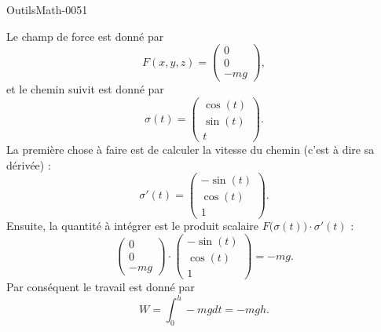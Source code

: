
\begin{corrige}{OutilsMath-0051}

    Le champ de force est donné par
    \begin{equation}
        F(x,y,z)=\begin{pmatrix}
            0    \\ 
            0    \\ 
            -mg    
        \end{pmatrix},
    \end{equation}
    et le chemin suivit est donné par 
    \begin{equation}
        \sigma(t)=\begin{pmatrix}
            \cos(t)    \\ 
            \sin(t)    \\ 
            t    
        \end{pmatrix}.
    \end{equation}
    La première chose à faire est de calculer la vitesse du chemin (c'est à dire sa dérivée) :
    \begin{equation}
        \sigma'(t)=\begin{pmatrix}
            -\sin(t)    \\ 
            \cos(t)    \\ 
            1    
        \end{pmatrix}.
    \end{equation}
    Ensuite, la quantité à intégrer est le produit scalaire $F\big( \sigma(t) \big)\cdot\sigma'(t)$ :
    \begin{equation}
        \begin{pmatrix}
            0    \\ 
            0    \\ 
            -mg    
        \end{pmatrix}\cdot\begin{pmatrix}
            -\sin(t)    \\ 
            \cos(t)    \\ 
            1    
        \end{pmatrix}=-mg.
    \end{equation}
    Par conséquent le travail est donné par
    \begin{equation}
        W=\int_0^h-mg dt=-mgh.
    \end{equation}

\end{corrige}
